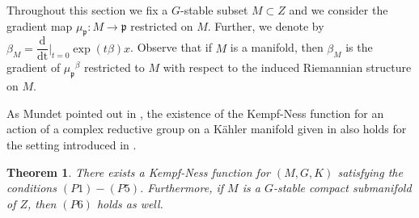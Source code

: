 \documentclass[leqno,11pt, a4]{amsart}
\newtheorem{teo}[equation]{Theorem}
\theoremstyle{named}
\begin{document}
Throughout this section we fix
a $G$-stable subset $M \subset Z$ and we consider the
gradient map ${\mu_{\mathfrak{p}}}:M {\longrightarrow} {\mathfrak{p}}$ restricted on $M$. Further, we denote by $\beta_M={{\dfrac {\mathrm {d}  }{\mathrm {dt}}} \vert _{t=0} } \exp(t\beta) x$. Observe that if $M$ is a manifold, then $\beta_M$  is the gradient of ${\mu_{\mathfrak{p}}}^\beta$ restricted to $M$ with respect to the induced Riemannian structure on $M$.

As Mundet pointed out in \cite{mundet-cont}, the existence of the Kempf-Ness function for an action of a complex reductive group on a K\"ahler manifold given in \cite{mundet-Crelles} also holds for the setting introduced in \cite{heinzner-schwarz-Cartan,heinzner-schwarz-stoetzel,heinzner-schutzdeller}.
\begin{teo}
There exists a Kempf-Ness function for $(M, G, K)$ satisfying the conditions $(P1)-(P5)$. Furthermore, if $M$ is a $G$-stable compact submanifold of $Z$, then $(P6)$ holds as well.
\end{teo}
\end{document}
